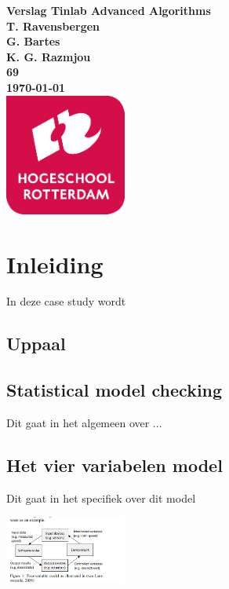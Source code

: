 \documentclass{article}
\begin{document}
	\sffamily
	\begin{titlepage}
		\centering
		\vfill
		{\bfseries\Huge
			Verslag Tinlab Advanced Algorithms \\
			\vskip2cm
		}
		{\bfseries\Large
			T. Ravensbergen\\ 
			G. Bartes\\
			K. G. Razmjou\\
		}
		{
			\bfseries\normalsize
			69\\
			\vskip1cm
			\today\\
		}    
		\vfill
		\includegraphics[width=4cm]{logohr.png} %
		\vfill
		\vfill
	\end{titlepage}
	\newpage
	\tableofcontents
	
	\newpage
	\section{Inleiding}
	In deze case study wordt %
	
	
	
	\subsection{Uppaal}
	
	\subsection{Statistical model checking}
	Dit gaat in het algemeen over ...
	
	\subsection{Het vier variabelen model}
	Dit gaat in het specifiek  over  dit model
	
	\includegraphics[width=4cm]{4varmodel.png} %
\end{document}

